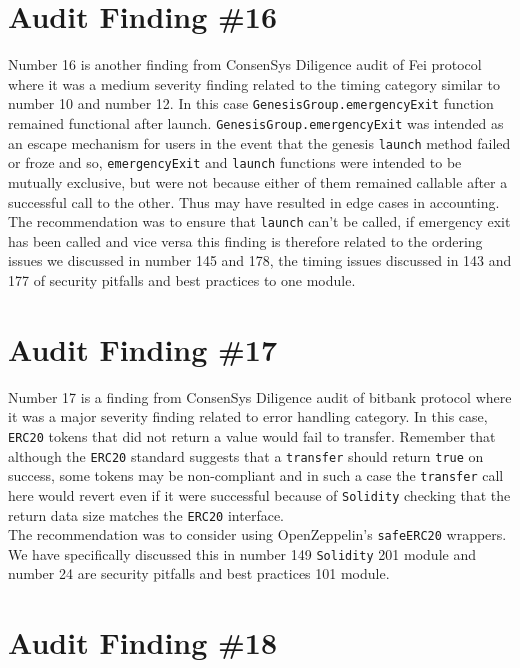 \section{Audit Finding \#16}

Number 16 is another finding from ConsenSys Diligence audit of Fei protocol where it was a medium severity finding related to the timing category similar to number 10 and number 12. In this case \verb|GenesisGroup.emergencyExit| function remained functional after launch. \verb|GenesisGroup.emergencyExit| was intended as an escape mechanism for users in the event that the genesis \verb|launch| method failed or froze and so, \verb|emergencyExit| and \verb|launch| functions were intended to be mutually exclusive, but were not because either of them remained callable after a successful call to the other. Thus may have resulted in edge cases in accounting.\\

The recommendation was to ensure that \verb|launch| can't be called, if emergency exit has been called and vice versa this finding is therefore related to the ordering issues we discussed in number 145 and 178, the timing issues discussed in 143 and 177 of security pitfalls and best practices to one module.

\section{Audit Finding \#17}

Number 17 is a finding from ConsenSys Diligence audit of bitbank protocol where it was a major severity finding related to error handling category. In this case, \verb|ERC20| tokens that did not return a value would fail to transfer. Remember that although the \verb|ERC20| standard suggests that a \verb|transfer| should return \verb|true| on success, some tokens may be non-compliant and in such a case the \verb|transfer| call here would revert even if it were successful because of \verb|Solidity| checking that the return data size matches the \verb|ERC20| interface.\\

The recommendation was to consider using OpenZeppelin's \verb|safeERC20| wrappers. We have specifically discussed this in number 149 \verb|Solidity| 201 module and number 24 are security pitfalls and best practices 101 module.

\section{Audit Finding \#18}


